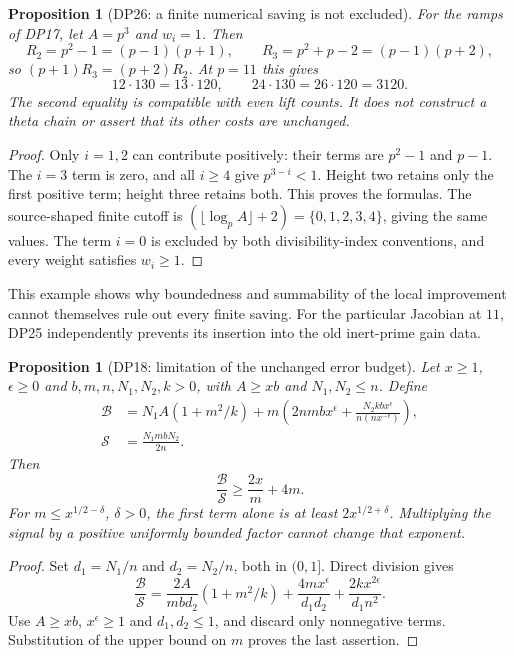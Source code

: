 \documentclass[11pt,a4paper]{article}
\newtheorem{proposition}[theorem]{Proposition}
\theoremstyle{definition}\newtheorem{remark}[theorem]{Remark}
\begin{document}
\begin{proposition}[DP26: a finite numerical saving is not excluded]\label{DP26}
For the ramps of DP17, let $A=p^3$ and $w_i=1$. Then
\[
 R_2=p^2-1=(p-1)(p+1),\qquad
 R_3=p^2+p-2=(p-1)(p+2),
\]
so $(p+1)R_3=(p+2)R_2$. At $p=11$ this gives
\[
 12\cdot130=13\cdot120,
 \qquad 24\cdot130=26\cdot120=3120.
\]
The second equality is compatible with even lift counts. It does not construct a theta chain or assert that its other costs are unchanged.
\end{proposition}
\begin{proof}
Only $i=1,2$ can contribute positively: their terms are $p^2-1$ and $p-1$. The $i=3$ term is zero, and all $i\ge4$ give $p^{3-i}<1$. Height two retains only the first positive term; height three retains both. This proves the formulas. The source-shaped finite cutoff is $(\lfloor\log_p A\rfloor+2)=\{0,1,2,3,4\}$, giving the same values. The term $i=0$ is excluded by both divisibility-index conventions, and every weight satisfies $w_i\ge1$.
\end{proof}
This example shows why boundedness and summability of the local improvement cannot themselves rule out every finite saving. For the particular Jacobian at $11$, DP25 independently prevents its insertion into the old inert-prime gain data.

\begin{proposition}[DP18: limitation of the unchanged error budget]\label{DP18}
Let $x\ge1$, $\epsilon\ge0$ and $b,m,n,N_1,N_2,k>0$, with $A\ge xb$ and $N_1,N_2\le n$. Define
\begin{align*}
 \mathcal B&=N_1A(1+m^2/k)
 +m\left(2nmbx^\epsilon+\frac{N_2kbx^\epsilon}{n(nx^{-\epsilon})}\right),\\
 \mathcal S&=\frac{N_1mbN_2}{2n}.
\end{align*}
Then
\[
 \frac{\mathcal B}{\mathcal S}\ge\frac{2x}{m}+4m.
\]
For $m\le x^{1/2-\delta}$, $\delta>0$, the first term alone is at least $2x^{1/2+\delta}$. Multiplying the signal by a positive uniformly bounded factor cannot change that exponent.
\end{proposition}
\begin{proof}
Set $d_1=N_1/n$ and $d_2=N_2/n$, both in $(0,1]$. Direct division gives
\[
 \frac{\mathcal B}{\mathcal S}
 =\frac{2A}{mbd_2}(1+m^2/k)
  +\frac{4mx^\epsilon}{d_1d_2}
  +\frac{2kx^{2\epsilon}}{d_1n^2}.
\]
Use $A\ge xb$, $x^\epsilon\ge1$ and $d_1,d_2\le1$, and discard only nonnegative terms. Substitution of the upper bound on $m$ proves the last assertion.
\end{proof}
\end{document}
